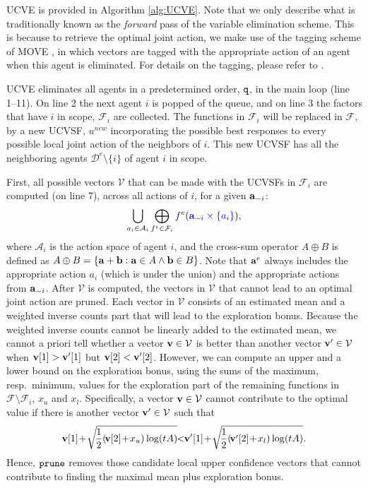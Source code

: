 \documentclass{article}
\begin{document}
UCVE is provided in Algorithm \ref{alg:UCVE}. Note that we only describe what is traditionally known as the \emph{forward} pass of the variable elimination scheme. This is because to retrieve the optimal joint action, we make use of the tagging scheme of MOVE \cite{roijers2015computing}, in which vectors are tagged with the appropriate action of an agent when this agent is eliminated. For details on the tagging, please refer to \cite{roijers2015computing}.  

UCVE eliminates all agents in a predetermined order, $\tt q$, in the main loop (line 1--11). On line 2 the next agent $i$ is popped of the queue, and on line 3 the factors that have $i$ in scope, $\mathcal{F}_i$ are collected. The functions in $\mathcal{F}_i$ will be replaced in $\mathcal{F}$, by a new UCVSF, $u^{new}$ incorporating the possible best responses to every possible local joint action of the neighbors of $i$. This new UCVSF has all the neighboring agents $\mathcal{D}^e \setminus \{i\}$ of agent $i$ in scope. 

First, all possible vectors $\mathcal{V}$ that can be made with the UCVSFs in $\mathcal{F}_i$ are computed (on line 7), across all actions of $i$, for a given ${\bf a}_{-i}$: 
\[\bigcup_{a_i\in\mathcal{A}_i} \bigoplus_{f^e\in \mathcal{F}_i} f^e(\textcolor{blue}{\mathbf{a}_{-i} \times \{a_i\}}),
\]
where $\mathcal{A}_i$ is the action space of agent $i$, and the cross-sum operator $A \oplus B$ is defined as $A \oplus B = \{ {\bf a} + {\bf b} : {\bf a}\in A \wedge {\bf b} \in B\}$.  Note that ${\bf a}^e$ always includes the appropriate action $a_i$ (which is under the union) and the appropriate actions from ${\bf a}_{-i}$.  After $\mathcal{V}$ is computed, the vectors in $\mathcal{V}$ that cannot lead to an optimal joint action are pruned. Each vector in $\mathcal{V}$ consists of an estimated mean and a weighted inverse counts part that will lead to the exploration bonus. Because the weighted inverse counts  cannot be linearly added to the estimated mean, we cannot a priori tell whether a vector ${\bf v} \in \mathcal{V}$ is better than  another vector ${\bf v}' \in \mathcal{V}$ when ${\bf v}[1]>{\bf v}'[1]$ but ${\bf v}[2]<{\bf v}'[2]$. 
However, we can compute an upper and a lower bound on the exploration bonus, using the sums of the maximum, resp.\ minimum, values for the exploration part of the remaining functions in $\mathcal{F} \setminus \mathcal{F}_i$, $x_u$ and $x_l$. Specifically, a vector ${\bf v} \in \mathcal{V}$ cannot contribute to the optimal value if there is another vector ${\bf v}' \in \mathcal{V}$ such that
\[
	{\bf v}[1]\!+\!\sqrt{\!\frac{1}{2}  (\!{\bf v}[2]\!+\!x_u) \log ( t A )}\!\! <\!\! {\bf v}'[1]\!+\! \sqrt{\!\frac{1}{2}  (\!{\bf v}'[2]\!+\!x_l) \log ( t A )}.
	\]
Hence, $\tt prune$ removes those candidate local upper confidence vectors that cannot contribute to finding the maximal mean plus exploration bonus. 
\end{document}
